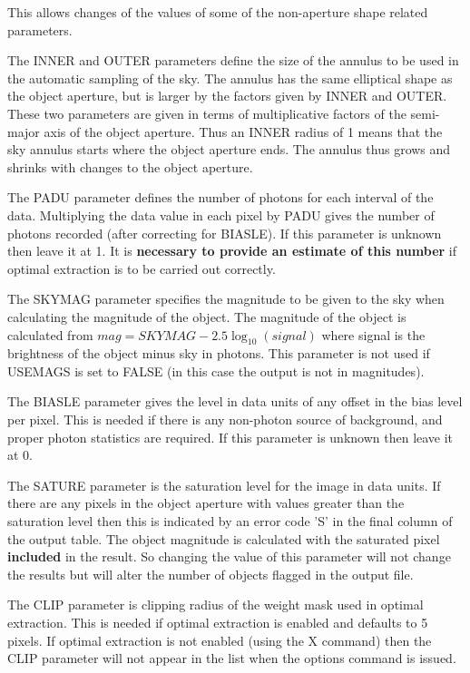\documentclass[twoside,11pt]{article}
\renewcommand{\_}{\texttt{\symbol{95}}}
\begin{document}
This allows changes of the values of some of the non-aperture shape
related parameters.

The INNER and OUTER parameters define the size of the annulus to be
used in the automatic sampling of the sky. The annulus has the same
elliptical shape as the object aperture, but is larger by the factors
given by INNER and OUTER. These two parameters are given in terms of
multiplicative factors of the semi-major axis of the object aperture.
Thus an INNER radius of 1 means that the sky annulus starts where the
object aperture ends. The annulus thus grows and shrinks with changes
to the object aperture.

The PADU parameter defines the number of photons for each interval of
the data. Multiplying the data value in each pixel by PADU gives the
number of photons recorded (after correcting for BIASLE). If this
parameter is unknown then leave it at 1. It is {\bf necessary to provide
an estimate of this number} if optimal extraction is to be carried
out correctly.

The SKYMAG parameter specifies the magnitude to be given to the sky
when calculating the magnitude of the object. The magnitude of the
object is calculated from
$mag = SKYMAG - 2.5 \log_{10}(signal)$
where signal is the brightness of the object minus sky in photons.
This parameter is not used if USEMAGS is set to FALSE (in this case
the output is not in magnitudes).

The BIASLE parameter gives the level in data units of any offset in
the bias level per pixel. This is needed if there is any non-photon
source of background, and proper photon statistics are required. If
this parameter is unknown then leave it at 0.

The SATURE parameter is the saturation level for the image in data
units. If there are any pixels in the object aperture with values
greater than the saturation level then this is indicated by an error
code 'S' in the final column of the output table. The object magnitude
is calculated with the saturated pixel \textbf{included} in the
result. So changing the value of this parameter will not change the
results but will alter the number of objects flagged in the output
file.

The CLIP parameter is clipping radius of the weight mask used in optimal
extraction. This is needed if optimal extraction is enabled and defaults
to 5 pixels. If optimal extraction is not enabled (using the X command)
then the CLIP parameter will not appear in the list when the options
command is issued.
\end{document}
